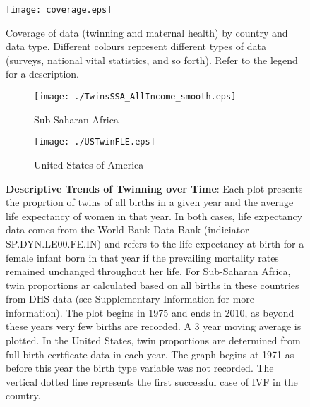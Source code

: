 \documentclass{nature}
\begin{document}
\begin{linenumbers}
\begin{spacing}{1}
\begin{figure}[htpb!]
\texttt{[image: coverage.eps]}
\caption{Coverage of data (twinning and maternal health) by country and data type.  Different colours represent different types of data (surveys, national vital statistics, and so forth).  Refer to the legend for a description.}
\label{fig:twincoverage}
\end{figure}


\begin{figure}[htpb!]
\begin{subfigure}{.5\textwidth}
  \texttt{[image: ./TwinsSSA\_AllIncome\_smooth.eps]}
   \caption{Sub-Saharan Africa}
\end{subfigure}%
\begin{subfigure}{.5\textwidth}
  \texttt{[image: ./USTwinFLE.eps]}
  \caption{United States of America}
\end{subfigure}
\caption{\textbf{Descriptive Trends of Twinning over Time}: Each plot presents the proprtion of
twins of all births in a given year and the average life expectancy of women in that year. In
both cases, life expectancy data comes from the World Bank Data Bank (indiciator SP.DYN.LE00.FE.IN) and refers to the life expectancy at birth for a female infant born in that year if the prevailing mortality rates remained unchanged throughout her life.  For Sub-Saharan Africa, twin proportions ar calculated based on all births in these countries from DHS data (see Supplementary Information for more information).  The plot begins in 1975 and ends in 2010, as beyond these years very few births are recorded.  A 3 year moving average is plotted.  In the United States, twin proportions are determined from full birth certficate data in each year.  The graph begins at 1971 as before this year the birth type variable was not recorded.  The vertical dotted line represents the first successful case of IVF in the country.}
\end{figure}

\clearpage








\clearpage


\end{spacing}
\end{linenumbers}
\end{document}
